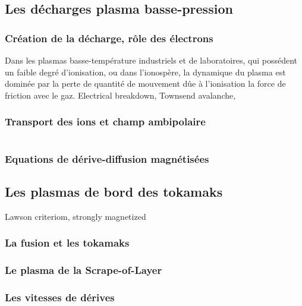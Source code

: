 \subsection{Les décharges plasma basse-pression}
\subsubsection{Création de la décharge, rôle des électrons}
Dans les plasmas basse-température industriels et de laboratoires, qui possédent
un faible degré d'ionisation, ou dans l'ionospère, la dynamique du plasma est dominée par
la perte de quantité de mouvement dûe à l'ionisation la force de friction avec
le gaz.
Electrical breakdown, Townsend avalanche,
\subsubsection{Transport des ions et champ ambipolaire}
\begin{equation}
\label{derivediffusion}
\end{equation}
\subsubsection{Equations de dérive-diffusion magnétisées}

\subsection{Les plasmas de bord des tokamaks}
Lawson criteriom, strongly magnetized
\subsubsection{La fusion et les tokamaks}
\subsubsection{Le plasma de la Scrape-of-Layer}
\subsubsection{Les vitesses de dérives}
\label{vitessesDerive}



